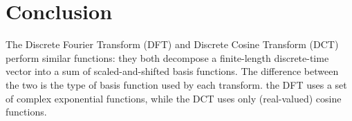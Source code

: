 \documentclass[journal,comsoc]{IEEEtran}
\begin{document}
%






\section{Conclusion}

The Discrete Fourier Transform (DFT) and Discrete Cosine Transform (DCT) perform similar functions:
they both decompose a finite-length discrete-time vector into a sum of scaled-and-shifted basis functions.
The difference between the two is the type of basis function used by each transform. the DFT uses a set of
complex exponential functions, while the DCT uses only (real-valued) cosine functions.
\end{document}
